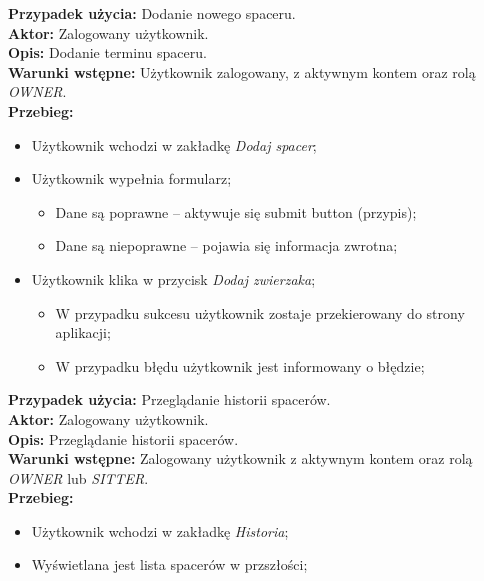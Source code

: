 \noindent
\textbf{Przypadek użycia:} Dodanie nowego spaceru. \\
\textbf{Aktor:} Zalogowany użytkownik. \\
\textbf{Opis:} Dodanie terminu spaceru. \\
\textbf{Warunki wstępne:} Użytkownik zalogowany, z aktywnym kontem oraz rolą \textit{OWNER}. \\
\textbf{Przebieg:}
\begin{itemize}
    \item Użytkownik wchodzi w zakładkę \textit{Dodaj spacer};
    \item Użytkownik wypełnia formularz;
    \begin{itemize}
        \item Dane są poprawne -- aktywuje się submit button (przypis);
        \item Dane są niepoprawne -- pojawia się informacja zwrotna;
    \end{itemize}
    \item Użytkownik klika w przycisk \textit{Dodaj zwierzaka};
    \begin{itemize}
        \item W przypadku sukcesu użytkownik zostaje przekierowany do strony aplikacji;
        \item W przypadku błędu użytkownik jest informowany o błędzie;
    \end{itemize}
\end{itemize}

\noindent
\textbf{Przypadek użycia:} Przeglądanie historii spacerów. \\
\textbf{Aktor:} Zalogowany użytkownik. \\
\textbf{Opis:} Przeglądanie historii spacerów. \\
\textbf{Warunki wstępne:} Zalogowany użytkownik z aktywnym kontem oraz rolą \textit{OWNER} lub \textit{SITTER}. \\
\textbf{Przebieg:}
\begin{itemize}
    \item Użytkownik wchodzi w zakładkę \textit{Historia};
    \item Wyświetlana jest lista spacerów w przszłości;
\end{itemize}

